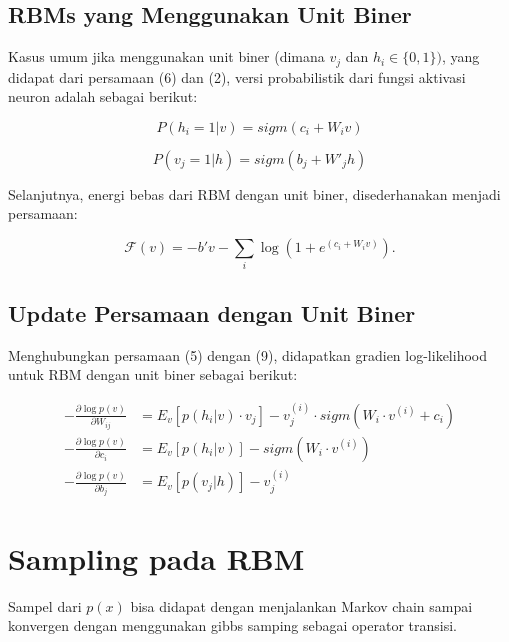 \subsection{RBMs yang Menggunakan Unit Biner}

Kasus umum jika menggunakan unit biner (dimana $v_j$ dan $h_i \in
\{0,1\})$, yang didapat dari persamaan (6) dan (2), versi probabilistik dari fungsi aktivasi neuron adalah sebagai berikut\citep{hinton2006reducing}:

\begin{equation}
P(h_i=1|v) = sigm(c_i + W_i v)
\end{equation}

\begin{equation}
P(v_j=1|h) = sigm(b_j + W'_j h)
\end{equation}

Selanjutnya, energi bebas dari RBM dengan unit biner, disederhanakan menjadi persamaan:

\begin{equation}
\mathcal{F}(v)= - b'v - \sum_i \log(1 + e^{(c_i + W_i v)}).
\end{equation}

\subsection{Update Persamaan dengan Unit Biner}

Menghubungkan persamaan (5) dengan (9), didapatkan gradien log-likelihood untuk RBM dengan unit biner sebagai berikut:

\begin{equation}
\begin{aligned}
- \frac{\partial{ \log p(v)}}{\partial W_{ij}} &=
    E_v[p(h_i|v) \cdot v_j]
    - v^{(i)}_j \cdot sigm(W_i \cdot v^{(i)} + c_i) \\
-\frac{\partial{ \log p(v)}}{\partial c_i} &=
    E_v[p(h_i|v)] - sigm(W_i \cdot v^{(i)})\\
-\frac{\partial{ \log p(v)}}{\partial b_j} &=
    E_v[p(v_j|h)] - v^{(i)}_j
\end{aligned}
\label{eq:eq2.10}
\end{equation}

\section{Sampling pada RBM}

Sampel dari $p(x)$ bisa didapat dengan menjalankan Markov chain sampai konvergen dengan menggunakan gibbs samping sebagai operator transisi. \\

